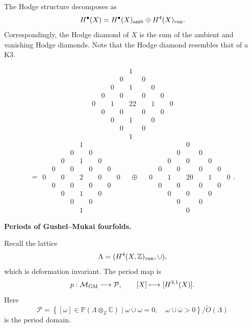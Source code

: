 The Hodge structure decomposes as
\[
        H^\bullet(X)
        =
        H^\bullet(X)_{\rm amb}
        \oplus H^4(X)_{\rm van}.
\]
Correspondingly, the Hodge diamond of
$X$ is the sum of the ambient and
vanishing Hodge diamonds.
Note that the Hodge diamond resembles
that of a K3.

\[
\begin{array}{ccccccccc}
&&&&1&&&&\\
&&&0&&0&&&\\
&&0&&1&&0&&\\
&0&&0&&0&&0&\\
0&&1&&22&&1&&0\\
&0&&0&&0&&0&\\
&&0&&1&&0&&\\
&&&0&&0&&&\\
&&&&1&&&&
\end{array}
\]
\[
=
\begin{array}{ccccccccc}
&&&&1&&&&\\
&&&0&&0&&&\\
&&0&&1&&0&&\\
&0&&0&&0&&0&\\
0&&0&&2&&0&&0\\
&0&&0&&0&&0&\\
&&0&&1&&0&&\\
&&&0&&0&&&\\
&&&&1&&&&
\end{array}
\quad
\oplus
\quad
\begin{array}{ccccccccc}
&&&&0&&&&\\
&&&0&&0&&&\\
&&0&&0&&0&&\\
&0&&0&&0&&0&\\
0&&1&&20&&1&&0\\
&0&&0&&0&&0&\\
&&0&&0&&0&&\\
&&&0&&0&&&\\
&&&&0&&&&
\end{array}.
\]

\medskip\noindent
{\bf Periods of Gushel--Mukai
fourfolds.}

Recall the lattice
\[
        \Lambda=
        (H^4(X,\mathbb{Z})_{\rm van},
        \cup),
\]
which is deformation invariant.
The period map is
\[
        p:\mathcal M_{\rm GM}
        \longrightarrow \mathcal P,
        \qquad
        [X]\longmapsto [H^{3,1}(X)].
\]
Here
\[
        \mathcal P
        =
        \left\{
        [\omega]\in
        \mathbb{P}(\Lambda
        \otimes_{\mathbb{Z}}\mathbb{C})
        \mid
        \omega\cup\omega=0,\quad
        \omega\cup\overline{\omega}>0
        \right\}
        /\widetilde O(\Lambda)
\]
is the period domain.

